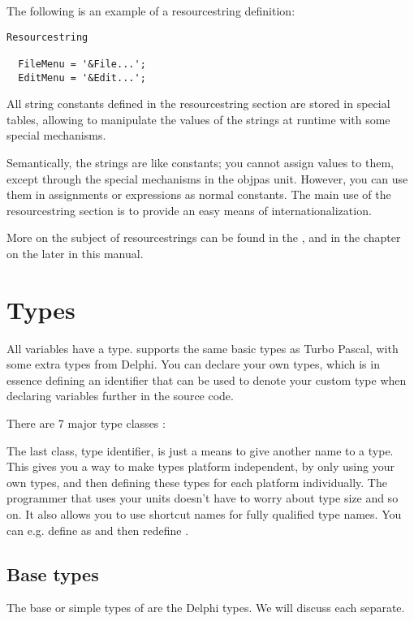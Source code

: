 \documentclass{report}
\begin{document}
The following is an example of a resourcestring definition:
\begin{verbatim}
Resourcestring

  FileMenu = '&File...';
  EditMenu = '&Edit...';
\end{verbatim}
All string constants defined in the resourcestring section are stored 
in special tables, allowing to manipulate the values of the strings 
at runtime with some special mechanisms.

Semantically, the strings are like constants; you cannot assign values to
them, except through the special mechanisms in the objpas unit. However,
you can use them in assignments or expressions as normal constants.
The main use of the resourcestring section is to provide an easy means
of internationalization.

More on the subject of resourcestrings can be found in the \progref, and 
in the chapter on the  later in this manual.

\chapter{Types}
All variables have a type. \fpc supports the same basic types as Turbo
Pascal, with some extra types from Delphi.
You can declare your own types, which is in essence defining an identifier
that can be used to denote your custom type when declaring variables further
in the source code.

There are 7 major type classes :

The last class, {\sffamily type identifier}, is just a means to give another
name to a type. This gives you a way to make types platform independent, by
only using your own types, and then defining these types for each platform
individually. The programmer that uses your units doesn't have to worry
about type size and so on. It also allows you to use shortcut names for
fully qualified type names. You can e.g. define  as
 and then redefine .

\section{Base types}
The base or simple types of \fpc are the Delphi types.
We will discuss each separate.

\end{document}

